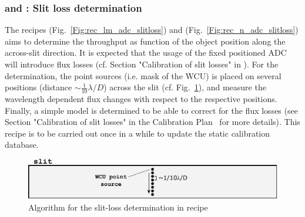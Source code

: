 \subsubsection{ and : Slit loss determination }\label{sssec:adc_slitlosses}
The recipes  (Fig.~\ref{Fig:rec_lm_adc_slitloss}) and  (Fig.~\ref{Fig:rec_n_adc_slitloss}) aims to determine the throughput as function of the object position along the across-slit direction. It is expected that the usage of the fixed positioned \ac{ADC} will introduce flux losses (cf. Section "Calibration of slit losses" in  \cite{METIS-calibration_plan}). For the determination, the point sources (i.e. mask of the \ac{WCU}) is placed on several positions (distance $\sim\frac{1}{10}\lambda/D$) across the slit (cf. Fig.~\ref{Fig:slitloss}), and measure the wavelength dependent flux changes with respect to the respective positions. Finally, a simple model is determined to be able to correct for the flux losses  (see Section "Calibration of slit losses" in the Calibration Plan~\cite{METIS-calibration_plan} for more details). This recipe is to be carried out once in a while to update the static calibration database.
\begin{figure}[ht]
  \centering
  \includegraphics[width=0.5\textheight]{figures/slitloss_det.pdf}
  \caption[slitloss determination]{Algorithm for the slit-loss determination in recipe  }
  \label{Fig:slitloss}
\end{figure}

